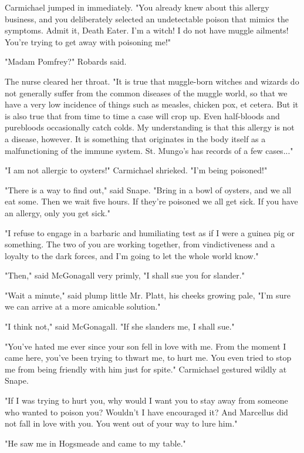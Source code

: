 \documentclass[a4paper,11pt]{article}
\begin{document}
Carmichael jumped in immediately. "You already knew about this allergy business, and you deliberately selected an undetectable poison that mimics the symptoms. Admit it, Death Eater. I'm a witch! I do not have muggle ailments! You're trying to get away with poisoning me!"

"Madam Pomfrey?" Robards said.

The nurse cleared her throat. "It is true that muggle-born witches and wizards do not generally suffer from the common diseases of the muggle world, so that we have a very low incidence of things such as measles, chicken pox, et cetera. But it is also true that from time to time a case will crop up. Even half-bloods and purebloods occasionally catch colds. My understanding is that this allergy is not a disease, however. It is something that originates in the body itself as a malfunctioning of the immune system. St. Mungo's has records of a few cases..."

"I am not allergic to oysters!" Carmichael shrieked. "I'm being poisoned!"

"There is a way to find out," said Snape. "Bring in a bowl of oysters, and we all eat some. Then we wait five hours. If they're poisoned we all get sick. If you have an allergy, only you get sick."

"I refuse to engage in a barbaric and humiliating test as if I were a guinea pig or something. The two of you are working together, from vindictiveness and a loyalty to the dark forces, and I'm going to let the whole world know."

"Then," said McGonagall very primly, "I shall sue you for slander."

"Wait a minute," said plump little Mr. Platt, his cheeks growing pale, "I'm sure we can arrive at a more amicable solution."

"I think not," said McGonagall. "If she slanders me, I shall sue."

"You've hated me ever since your son fell in love with me. From the moment I came here, you've been trying to thwart me, to hurt me. You even tried to stop me from being friendly with him just for spite." Carmichael gestured wildly at Snape.

"If I was trying to hurt you, why would I want you to stay away from someone who wanted to poison you? Wouldn't I have encouraged it? And Marcellus did not fall in love with you. You went out of your way to lure him."

"He saw me in Hogsmeade and came to my table."
\end{document}

